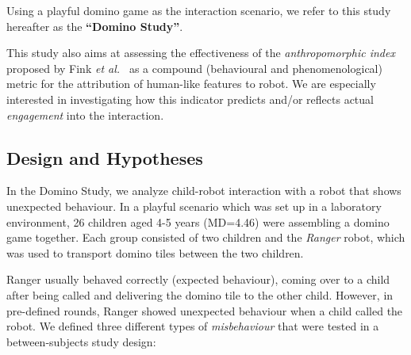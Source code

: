 \documentclass{sig-alternate}
\newcommand{\etal}{{\textit{et al.~}}}
\begin{document}
Using a playful domino game as the interaction scenario, we refer to this study
hereafter as the \textbf{``Domino Study''}.

This study also aims at assessing the effectiveness of the \emph{anthropomorphic
index} proposed by Fink \etal\cite{fink2014dynamics} as a compound (behavioural
and phenomenological) metric for the attribution of human-like features to
robot. We are especially interested in investigating how this indicator predicts
and/or reflects actual \emph{engagement} into the interaction.

\subsection{Design and Hypotheses}

In the Domino Study, we analyze child-robot interaction with a robot that shows
unexpected behaviour. In a playful scenario which was set up in a laboratory
environment, 26 children aged 4-5 years (MD=4.46) were assembling a domino game together.
Each group consisted of two children and the \emph{Ranger} robot, which was used
to transport domino tiles between the two children.

Ranger usually behaved correctly (expected behaviour), coming over to a child
after being called and delivering the domino tile to the other child. However,
in pre-defined rounds, Ranger showed unexpected behaviour when a child called the
robot. We defined three different types of \textit{misbehaviour} that were tested
in a between-subjects study design:
\end{document}
